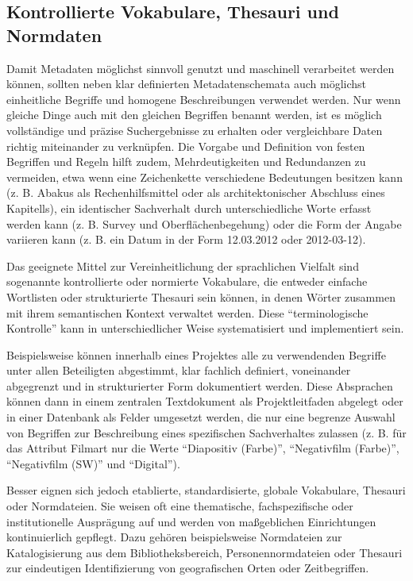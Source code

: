 
\subsection{Kontrollierte Vokabulare, Thesauri und Normdaten}
Damit Metadaten möglichst sinnvoll genutzt und maschinell verarbeitet werden können, sollten neben klar definierten Metadatenschemata auch möglichst einheitliche Begriffe und homogene Beschreibungen verwendet werden. Nur wenn gleiche Dinge auch mit den gleichen Begriffen benannt werden, ist es möglich vollständige und präzise Suchergebnisse zu erhalten oder vergleichbare Daten richtig miteinander zu verknüpfen. Die Vorgabe und Definition von festen Begriffen und Regeln hilft zudem, Mehrdeutigkeiten und Redundanzen zu vermeiden, etwa wenn eine Zeichenkette verschiedene Bedeutungen besitzen kann (z. B. Abakus als Rechenhilfsmittel oder als architektonischer Abschluss eines Kapitells), ein identischer Sachverhalt durch unterschiedliche Worte erfasst werden kann (z. B. Survey und Oberflächenbegehung) oder die Form der Angabe variieren kann (z. B. ein Datum in der Form 12.03.2012 oder 2012-03-12).
 
Das geeignete Mittel zur Vereinheitlichung der sprachlichen Vielfalt sind sogenannte kontrollierte oder normierte Vokabulare, die entweder einfache Wortlisten oder strukturierte Thesauri sein können, in denen Wörter zusammen mit ihrem semantischen Kontext verwaltet werden. Diese "`terminologische Kontrolle"' kann in unterschiedlicher Weise systematisiert und implementiert sein. 

Beispielsweise können innerhalb eines Projektes alle zu verwendenden Begriffe unter allen Beteiligten abgestimmt, klar fachlich definiert, voneinander abgegrenzt und in strukturierter Form dokumentiert werden. Diese Absprachen können dann in einem zentralen Textdokument als Projektleitfaden abgelegt oder in einer Datenbank als Felder umgesetzt werden, die nur eine begrenze Auswahl von Begriffen zur Beschreibung eines spezifischen Sachverhaltes zulassen (z. B. für das Attribut Filmart nur die Werte "`Diapositiv (Farbe)"', "`Negativfilm (Farbe)"', "`Negativfilm (SW)"' und "`Digital"').

Besser eignen sich jedoch etablierte, standardisierte, globale Vokabulare, Thesauri oder Normdateien. Sie weisen oft eine thematische, fachspezifische oder institutionelle Ausprägung auf und werden von maßgeblichen Einrichtungen kontinuierlich gepflegt. Dazu gehören beispielsweise Normdateien zur Katalogisierung aus dem Bibliotheksbereich, Personennormdateien oder Thesauri zur eindeutigen Identifizierung von geografischen Orten oder Zeitbegriffen. 

